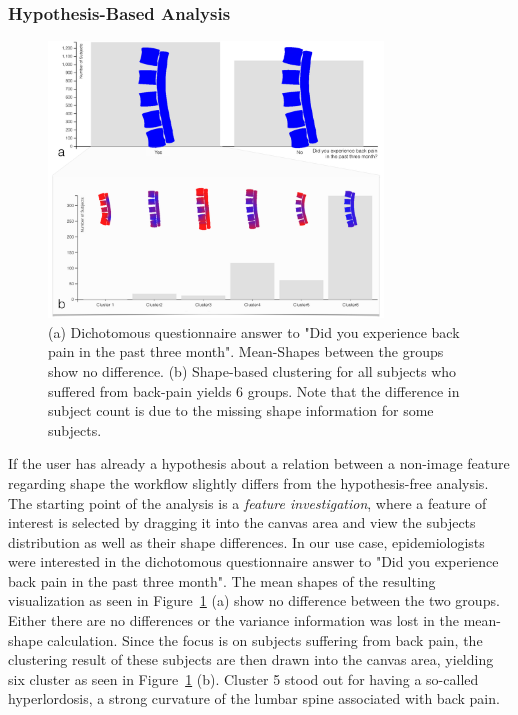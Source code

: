 \documentclass[journal]{style/vgtc} 			          %
\begin{document}
\subsubsection{Hypothesis-Based Analysis} \label{Hypothesis based Analysis}
\begin{figure}[htb]
 \centering
 \includegraphics[width=3.5in]{figures/hypothesisbased}
 \caption{(a) Dichotomous questionnaire answer to "Did you experience back pain in the past three month".
 Mean-Shapes between the groups show no difference.
 (b) Shape-based clustering for all subjects who suffered from back-pain yields 6 groups. 
 Note that the difference in subject count is due to the missing shape information for some subjects.
 }
 \label{fig:hypopthesisbased}
\end{figure}
%
If the user has already a hypothesis about a relation between a non-image feature regarding shape the workflow slightly differs from the hypothesis-free analysis.
%
The starting point of the analysis is a \emph{feature investigation}, where a feature of interest is selected by dragging it into the canvas area and view the subjects distribution as well as their shape differences.
%
In our use case, epidemiologists were interested in the dichotomous questionnaire answer to "Did you experience back pain in the past three month".
%
The mean shapes of the resulting visualization as seen in Figure~\ref{fig:hypopthesisbased} (a) show no difference between the two groups.
%
Either there are no differences or the variance information was lost in the mean-shape calculation.
%
Since the focus is on subjects suffering from back pain, the clustering result of these subjects are then drawn into the canvas area, yielding six cluster as seen in Figure~\ref{fig:hypopthesisbased} (b).
%
Cluster 5 stood out for having a so-called hyperlordosis, a strong curvature of the lumbar spine associated with back pain.
\end{document}
